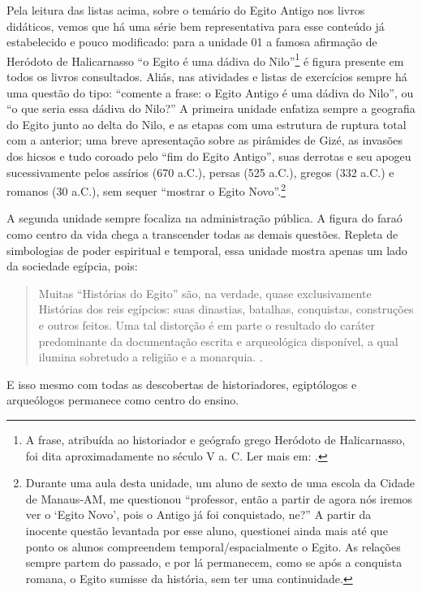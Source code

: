 \begin{refsection}
    Pela leitura das listas acima, sobre o temário do Egito Antigo nos livros didáticos, vemos que há uma série bem representativa para esse conteúdo já estabelecido e pouco modificado: para a unidade 01 a famosa afirmação de Heródoto de Halicarnasso ``o Egito é uma dádiva do Nilo''\footnote{A frase, atribuída ao historiador e geógrafo grego Heródoto de Halicarnasso, foi dita aproximadamente no século V a. C. Ler mais em: .} é figura presente em todos os livros consultados. Aliás, nas atividades e listas de exercícios sempre há uma questão do tipo: ``comente a frase: o Egito Antigo é uma dádiva do Nilo'', ou ``o que seria essa dádiva do Nilo?'' A primeira unidade enfatiza sempre a  geografia do Egito junto ao delta do Nilo, e as etapas com uma estrutura de ruptura total com a anterior; uma breve apresentação sobre as pirâmides de Gizé, as invasões dos hicsos e tudo coroado pelo ``fim do Egito Antigo'', suas derrotas e seu apogeu sucessivamente pelos assírios (670 a.C.), persas (525 a.C.), gregos (332 a.C.) e romanos (30 a.C.), sem sequer ``mostrar o Egito Novo''.\footnote{Durante uma aula desta unidade, um aluno de sexto de uma escola da Cidade de Manaus-AM, me questionou ``professor, então a partir de agora nós iremos ver o `Egito Novo', pois o Antigo já foi conquistado, ne?'' A partir da inocente questão levantada por esse aluno, questionei ainda mais até que ponto os alunos compreendem temporal/espacialmente o Egito. As relações sempre partem do passado, e por lá permanecem, como se após a conquista romana, o Egito sumisse da história, sem ter uma continuidade.}

    A segunda unidade sempre focaliza na administração pública. A figura do faraó como centro da vida chega a transcender todas as demais questões. Repleta de simbologias de poder espiritual e temporal, essa unidade mostra apenas um lado da sociedade egípcia, pois:

    \begin{quotation}
        Muitas ``Histórias do Egito'' são, na verdade, quase exclusivamente Histórias dos reis egípcios: suas dinastias, batalhas, conquistas, construções e outros feitos. Uma tal distorção é em parte o resultado do caráter predominante da documentação escrita e arqueológica disponível, a qual ilumina sobretudo a religião e a monarquia. \cite[p.~9]{Cardoso2004Egito}.
    \end{quotation}

    E isso mesmo com todas as descobertas de historiadores, egiptólogos e arqueólogos permanece como centro do ensino.  


\end{refsection}
